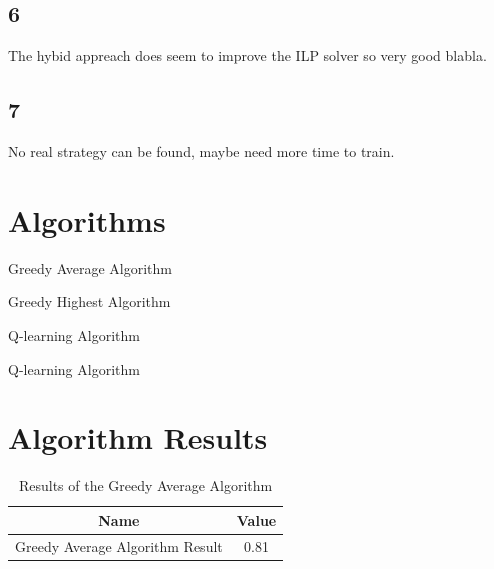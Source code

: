 \documentclass{article}
\begin{document}
\subsection*{6}
The hybid appreach does seem to improve the ILP solver so very good blabla.
\subsection*{7}
No real strategy can be found, maybe need more time to train.
\newpage
\begin{appendices}
\section*{Algorithms}

 \begin{algorithm}[ht]
\SetAlgoLined
{}
\label{Greedy average}
 \caption{Greedy Average Algorithm}
\end{algorithm}

 \begin{algorithm}[ht]
\SetAlgoLined
{}
\label{Greedy highest}
 \caption{Greedy Highest Algorithm}
\end{algorithm}

 \begin{algorithm}[ht]
\SetAlgoLined
    \caption{Q-learning Algorithm}
\label{Q-learning algo}
 \caption{Q-learning Algorithm}
\end{algorithm}

\newpage

\section*{Algorithm Results}
\begin{table}[ht]
    \centering
    \begin{tabular}{@{}cc@{}}
    \toprule
    \textbf{Name} & \textbf{Value} \\ \midrule
    Greedy Average Algorithm Result & 0.81 \\ \bottomrule
    \end{tabular}
    \caption{Results of the Greedy Average Algorithm}
    \label{tab:greedy-average}
\end{table}


\end{appendices}
\end{document}
